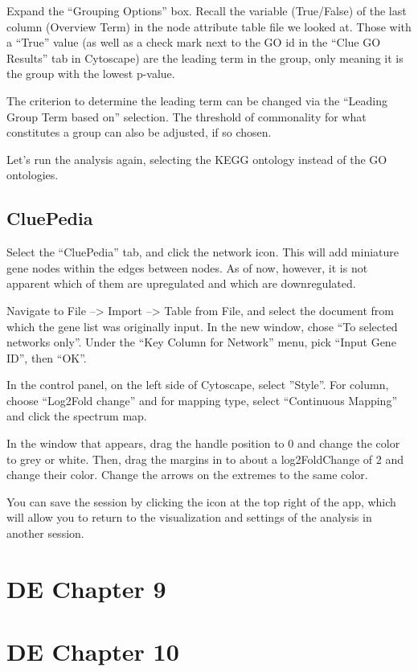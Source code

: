 \documentclass[
]{book}
\begin{document}
Expand the ``Grouping Options'' box. Recall the variable (True/False) of the last column (Overview Term) in the node attribute table file we looked at. Those with a ``True'' value (as well as a check mark next to the GO id in the ``Clue GO Results'' tab in Cytoscape) are the leading term in the group, only meaning it is the group with the lowest p-value.

The criterion to determine the leading term can be changed via the ``Leading Group Term based on'' selection. The threshold of commonality for what constitutes a group can also be adjusted, if so chosen.

Let's run the analysis again, selecting the KEGG ontology instead of the GO ontologies.

\hypertarget{cluepedia}{%
\section{CluePedia}\label{cluepedia}}

Select the ``CluePedia'' tab, and click the network icon. This will add miniature gene nodes within the edges between nodes. As of now, however, it is not apparent which of them are upregulated and which are downregulated.

Navigate to File --\textgreater{} Import --\textgreater{} Table from File, and select the document from which the gene list was originally input. In the new window, chose ``To selected networks only''. Under the ``Key Column for Network'' menu, pick ``Input Gene ID'', then ``OK''.

In the control panel, on the left side of Cytoscape, select ''Style''. For column, choose ``Log2Fold change'' and for mapping type, select ``Continuous Mapping'' and click the spectrum map.

In the window that appears, drag the handle position to 0 and change the color to grey or white. Then, drag the margins in to about a log2FoldChange of 2 and change their color. Change the arrows on the extremes to the same color.

You can save the session by clicking the icon at the top right of the app, which will allow you to return to the visualization and settings of the analysis in another session.

\hypertarget{de-chapter-9}{%
\chapter{DE Chapter 9}\label{de-chapter-9}}

\hypertarget{de-chapter-10}{%
\chapter{DE Chapter 10}\label{de-chapter-10}}

  
\end{document}

